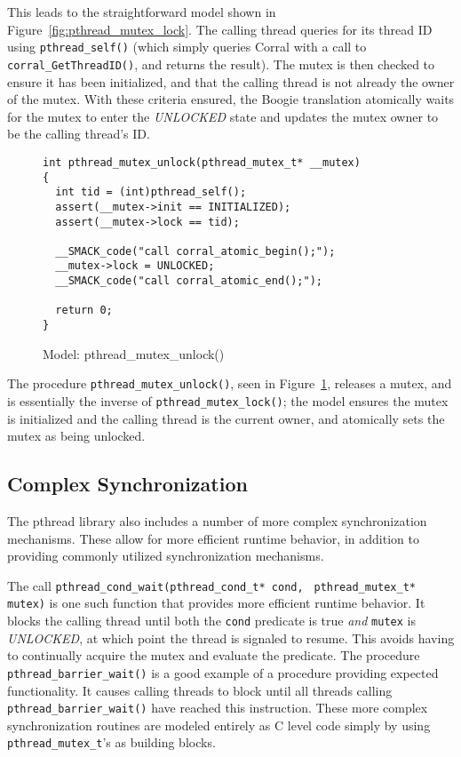 This leads to the straightforward model shown in
Figure~\ref{fig:pthread_mutex_lock}. The calling thread queries for
its thread ID using \lstinline|pthread_self()| (which simply queries
Corral with a call to \lstinline|corral_GetThreadID()|, and returns
the result). The mutex is then checked to ensure it has been
initialized, and that the calling thread is not already the owner of
the mutex.  With these criteria ensured, the Boogie translation
atomically waits for the mutex to enter the \emph{UNLOCKED} state and
updates the mutex owner to be the calling thread's ID. 

\begin{figure}[!ht]
\centering
\begin{lstlisting}
int pthread_mutex_unlock(pthread_mutex_t* __mutex)
{
  int tid = (int)pthread_self();
  assert(__mutex->init == INITIALIZED);
  assert(__mutex->lock == tid);

  __SMACK_code("call corral_atomic_begin();");
  __mutex->lock = UNLOCKED;
  __SMACK_code("call corral_atomic_end();");

  return 0;
}
\end{lstlisting}
\caption{Model: pthread\_mutex\_unlock()}
\label{fig:pthread_mutex_unlock}
\end{figure}

The procedure \lstinline|pthread_mutex_unlock()|, seen in
Figure~\ref{fig:pthread_mutex_unlock}, releases a mutex, and is
essentially the inverse of \lstinline|pthread_mutex_lock()|; the model
ensures the mutex is initialized and the calling thread is the current
owner, and atomically sets the mutex as being unlocked. 

\subsection{Complex Synchronization}
The pthread library also includes a number of more complex
synchronization mechanisms.  These allow for more efficient runtime
behavior, in addition to providing commonly utilized synchronization
mechanisms.

The call \lstinline|pthread_cond_wait(pthread_cond_t* cond, |
\lstinline|pthread_mutex_t* mutex)|  is one such function that
provides more efficient runtime behavior.  It blocks the calling
thread until both the \lstinline|cond| predicate is true \emph{and}
\lstinline|mutex| is \emph{UNLOCKED}, at which point the thread is
signaled to resume. This avoids having to continually acquire the
mutex and evaluate the predicate.  The procedure
\lstinline|pthread_barrier_wait()| is a good example of a procedure
providing expected functionality.  It causes calling threads to block
until all threads calling \lstinline|pthread_barrier_wait()| have
reached this instruction. These more complex synchronization routines
are modeled entirely as C level code simply by using
\lstinline|pthread_mutex_t|'s as building blocks. 

